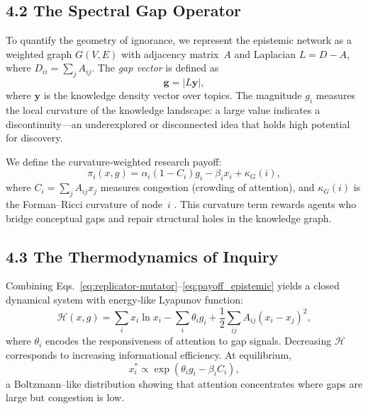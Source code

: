 \documentclass[11pt,a4paper,titlepage]{article}
\theoremstyle{definition}
\begin{document}
\subsection{4.2 The Spectral Gap Operator}

To quantify the geometry of ignorance, we represent the epistemic network as a
weighted graph $G(V,E)$ with adjacency matrix~$A$ and Laplacian
$L = D - A$, where $D_{ii}=\sum_j A_{ij}$.
The \emph{gap vector} is defined as
\begin{equation}
\mathbf{g} = |L\mathbf{y}|,
\label{eq:gap_operator}
\end{equation}
where $\mathbf{y}$ is the knowledge density vector over topics.
The magnitude $g_i$ measures the local curvature of the knowledge landscape:
a large value indicates a discontinuity—an underexplored or disconnected idea
that holds high potential for discovery.

We define the curvature‐weighted research payoff:
\begin{equation}
\pi_i(x,g) = 
  \alpha_i (1 - C_i)g_i 
  - \beta_i x_i
  + \kappa_G(i),
\label{eq:payoff_epistemic}
\end{equation}
where $C_i = \sum_j A_{ij}x_j$ measures congestion (crowding of attention),
and $\kappa_G(i)$ is the Forman–Ricci curvature of node~$i$
\cite{fortunato2018,evans2011}.
This curvature term rewards agents who bridge conceptual gaps and repair
structural holes in the knowledge graph.

\subsection{4.3 The Thermodynamics of Inquiry}

Combining Eqs.~\eqref{eq:replicator-mutator}–\eqref{eq:payoff_epistemic}
yields a closed dynamical system with energy‐like Lyapunov function:
\begin{equation}
\mathcal{H}(x,g) = 
  \sum_i x_i \ln x_i 
  - \sum_i \theta_i g_i 
  + \frac{1}{2}\sum_{ij}A_{ij}(x_i - x_j)^2,
\label{eq:epistemic_hamiltonian}
\end{equation}
where $\theta_i$ encodes the responsiveness of attention to gap signals.
Decreasing $\mathcal{H}$ corresponds to increasing informational efficiency.
At equilibrium,
\begin{equation}
x_i^* \propto \exp(\theta_i g_i - \beta_i C_i),
\label{eq:epistemic_equilibrium}
\end{equation}
a Boltzmann–like distribution showing that attention concentrates where gaps
are large but congestion is low.
\end{document}
